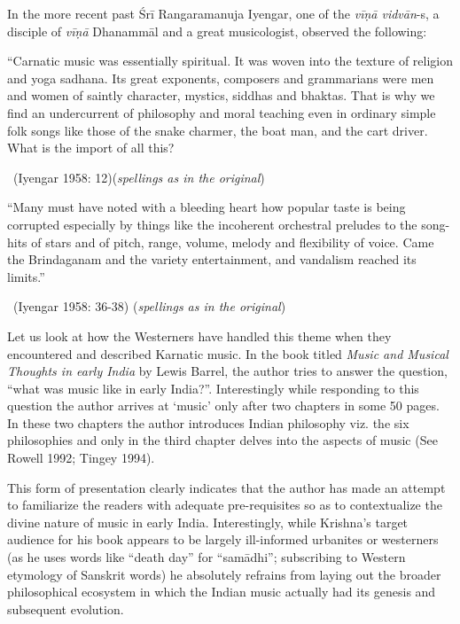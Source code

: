 In the more recent past Śrī Rangaramanuja Iyengar, one of the \textit{vīṇā vidvān}-s, a disciple of \textit{vīṇā} Dhanammāl and a great musicologist, observed the following:

\begin{myquote}
“Carnatic music was essentially spiritual. It was woven into the texture of religion and yoga sadhana. Its great exponents, composers and grammarians were men and women of saintly character, mystics, siddhas and bhaktas. That is why we find an undercurrent of philosophy and moral teaching even in ordinary simple folk songs like those of the snake charmer, the boat man, and the cart driver. What is the import of all this? 

~\hfill (Iyengar 1958: 12)(\textit{spellings as in the original})
\end{myquote}

\vspace{.1cm}

\begin{myquote}
“Many must have noted with a bleeding heart how popular taste is being corrupted especially by things like the incoherent orchestral preludes to the song-hits of stars and of pitch, range, volume, melody and flexibility of voice. Came the Brindaganam and the variety entertainment, and vandalism reached its limits.” 

~\hfill (Iyengar 1958: 36-38) (\textit{spellings as in the original})
\end{myquote}

Let us look at how the Westerners have handled this theme when they encountered and described Karnatic music. In the book titled \textit{Music and Musical Thoughts in early India} by Lewis Barrel, the author tries to answer the question, “what was music like in early India?”. Interestingly while responding to this question the author arrives at ‘music’ only after two chapters in some 50 pages. In these two chapters the author introduces Indian philosophy viz. the six philosophies and only in the third chapter delves into the aspects of music (See Rowell 1992; Tingey 1994).

This form of presentation clearly indicates that the author has made an attempt to familiarize the readers with adequate pre-requisites so as to contextualize the divine nature of music in early India. Interestingly, while Krishna’s target audience for his book appears to be largely ill-informed urbanites or westerners (as he uses words like “death day” for “samādhi”; subscribing to Western etymology of Sanskrit words) he absolutely refrains from laying out the broader philosophical ecosystem in which the Indian music actually had its genesis and subsequent evolution.

